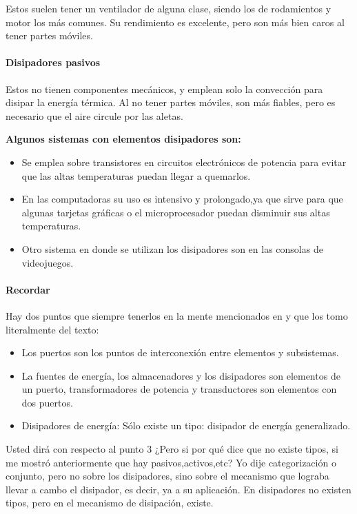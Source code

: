 Estos suelen tener un ventilador de alguna clase, siendo los de rodamientos y motor los más comunes. Su rendimiento es excelente, pero son más bien caros al tener partes móviles.\

\paragraph{Disipadores pasivos}
Estos no tienen componentes mecánicos, y emplean solo la convección para disipar la energía térmica. Al no tener partes móviles, son más fiables, pero es necesario que el aire circule por las aletas.

\textbf{Algunos sistemas con elementos disipadores son:}

\begin{itemize}
	\item Se emplea sobre transistores en circuitos electrónicos de potencia para evitar que las altas temperaturas puedan llegar a quemarlos.
	\item En las computadoras su uso es intensivo y prolongado,ya que sirve para que algunas tarjetas gráficas o el microprocesador puedan disminuir sus altas temperaturas.
	\item Otro sistema en donde se utilizan los disipadores son en las consolas de videojuegos.
\end{itemize}

\paragraph{Recordar}

Hay dos puntos que siempre tenerlos en la mente mencionados en \cite{w1} y que los tomo literalmente del texto:

\begin{itemize}
	\item Los puertos son los puntos de interconexión entre elementos y
	subsistemas.
	\item La fuentes de energía, los almacenadores y los disipadores son
	elementos de un puerto, transformadores de potencia y transductores
	son elementos con dos puertos.
	\item Disipadores de energía: Sólo existe un tipo: disipador de energía
	generalizado.

\end{itemize}

Usted dirá con respecto al punto 3 ¿Pero si por qué dice que no existe tipos, si me mostró anteriormente que hay pasivos,activos,etc? Yo dije categorización o conjunto, pero no sobre los disipadores, sino sobre el mecanismo que lograba llevar a cambo el disipador, es decir, ya a su aplicación. En disipadores no existen tipos, pero en el mecanismo de disipación, existe.
	
